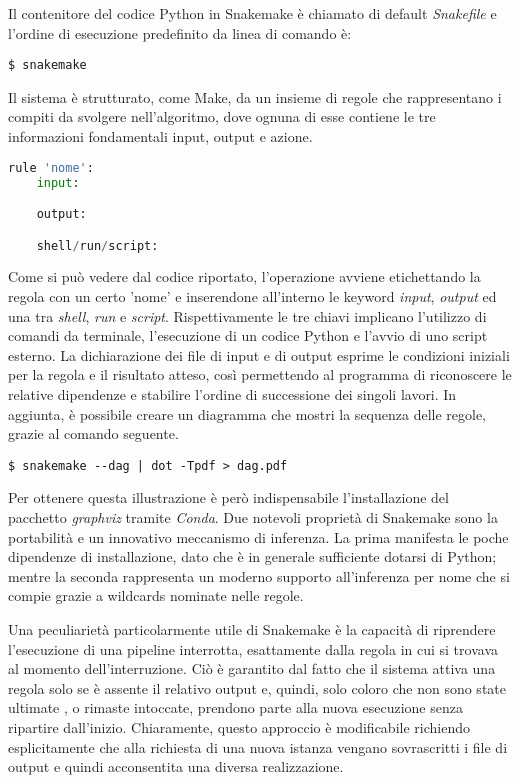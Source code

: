 Il contenitore del codice Python in Snakemake è chiamato di default \textit{Snakefile} e l'ordine di esecuzione predefinito da linea di comando è:
\begin{lstlisting}
$ snakemake
\end{lstlisting}
Il sistema è strutturato, come Make, da un insieme di regole che rappresentano i compiti da svolgere nell'algoritmo, dove ognuna di esse contiene le tre informazioni fondamentali input, output e azione.
\begin{lstlisting}[language=Python]
rule 'nome':
	input:

	output:

	shell/run/script:

\end{lstlisting}
Come si può vedere dal codice riportato, l'operazione avviene etichettando la regola con un certo 'nome' e inserendone all'interno le keyword \textit{input}, \textit{output} ed una tra \textit{shell}, \textit{run} e \textit{script}.
Rispettivamente le tre chiavi implicano l'utilizzo di comandi da terminale, l'esecuzione di un codice Python e l'avvio di uno script esterno.
La dichiarazione dei file di input e di output esprime le condizioni iniziali per la regola e il risultato atteso, così permettendo al programma di riconoscere le relative dipendenze e stabilire l'ordine di successione dei singoli lavori.
In aggiunta, è possibile creare un diagramma che mostri la sequenza delle regole, grazie al comando seguente.
\begin{lstlisting}
$ snakemake --dag | dot -Tpdf > dag.pdf
\end{lstlisting}
Per ottenere questa illustrazione è però indispensabile l'installazione del pacchetto \textit{graphviz} tramite \textit{Conda}.
Due notevoli proprietà di Snakemake sono la portabilità e un innovativo meccanismo di inferenza.
La prima manifesta le poche dipendenze di installazione, dato che è in generale sufficiente dotarsi di Python; mentre la seconda rappresenta un moderno supporto all'inferenza per nome che si compie grazie a wildcards nominate nelle regole.

Una peculiarietà particolarmente utile di Snakemake è la capacità di riprendere l'esecuzione di una pipeline interrotta, esattamente dalla regola in cui si trovava al momento dell'interruzione.
Ciò è garantito dal fatto che il sistema attiva una regola solo se è assente il relativo output e, quindi, solo coloro che non sono state ultimate , o rimaste intoccate, prendono parte alla nuova esecuzione senza ripartire dall'inizio.
Chiaramente, questo approccio è modificabile richiendo esplicitamente che alla richiesta di una nuova istanza vengano sovrascritti i file di output e quindi acconsentita una diversa realizzazione.


